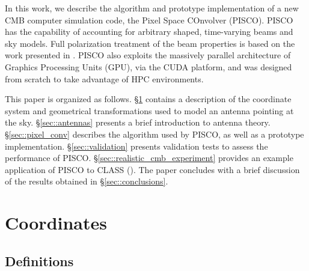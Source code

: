 \documentclass[a4paper,11pt]{article}
\begin{document}



In this work, we describe the algorithm and prototype implementation of a new CMB computer simulation code, the Pixel Space COnvolver (PISCO). PISCO has the capability of accounting for arbitrary shaped, time-varying beams and sky models. Full polarization treatment of the beam properties is based on the work presented in \cite{2007MNRAS.376.1767O}. PISCO also exploits the massively parallel architecture of Graphics Processing Units (GPU), via the CUDA platform, and was designed from scratch to take advantage of HPC environments.

This paper is organized as follows. 
\S\ref{sec::coordinate-systems} contains a description of the coordinate system and geometrical transformations used to model an antenna pointing at the sky.
\S\ref{sec::antennas} presents a brief introduction to antenna theory. 
\S\ref{sec::pixel_conv} describes the algorithm used by PISCO, as well as a prototype implementation. 
\S\ref{sec::validation} presents validation tests to assess the performance of PISCO. 
\S\ref{sec::realistic_cmb_experiment} provides an example application of PISCO to CLASS (\cite{2016SPIE.9914E..1KH}). 
The paper concludes with a brief discussion of the results obtained in \S\ref{sec::conclusions}.

%
\section{Coordinates}
\label{sec::coordinate-systems}

\subsection{Definitions}
\end{document}
